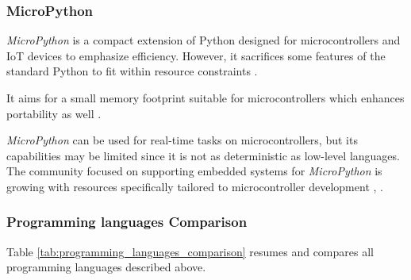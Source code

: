\subsubsection{MicroPython}
\textit{MicroPython} is a compact extension of Python designed for microcontrollers and \gls{IoT} devices to emphasize efficiency.
However, it sacrifices some features of the standard Python to fit within resource constraints \cite{LPROG2}.

It aims for a small memory footprint suitable for microcontrollers which enhances portability as well \cite{LPROG7}.

\textit{MicroPython} can be used for real-time tasks on microcontrollers, but its capabilities may be limited since it is not as deterministic as low-level languages.
The community focused on supporting embedded systems for \textit{MicroPython} is growing with resources specifically tailored to microcontroller development \cite{LPROG2}, \cite{LPROG5}.

\subsubsection{Programming languages Comparison}
Table \ref{tab:programming_languages_comparison} resumes and compares all programming languages described above.
\begin{table}[H]
    \centering
    \caption{Comparison of Programming Languages}
    \label{tab:programming_languages_comparison}
\end{table}

